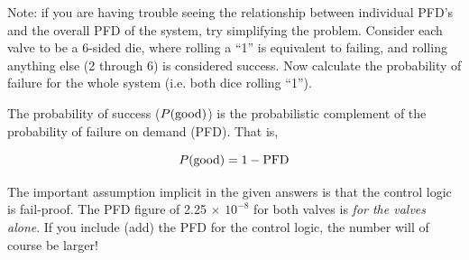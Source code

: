 \vskip 10pt

Note: if you are having trouble seeing the relationship between individual PFD's and the overall PFD of the system, try simplifying the problem.  Consider each valve to be a 6-sided die, where rolling a ``1'' is equivalent to failing, and rolling anything else (2 through 6) is considered success.  Now calculate the probability of failure for the whole system (i.e. both dice rolling ``1'').







The probability of success ($P(\hbox{good})$) is the probabilistic complement of the probability of failure on demand (PFD).  That is, 

$$P(\hbox{good}) = 1 - \hbox{PFD}$$

\vskip 10pt

The important assumption implicit in the given answers is that the control logic is fail-proof.  The PFD figure of 2.25 $\times$ $10^{-8}$ for both valves is {\it for the valves alone}.  If you include (add) the PFD for the control logic, the number will of course be larger!




